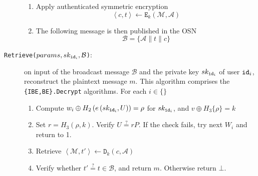\begin{algorithm}[H]
\begin{description}
\begin{enumerate}
        \item Apply authenticated symmetric encryption
        \begin{equation*}
            \left< c, t \right> \leftarrow \mathtt{E}_k(\mathcal{M},\mathcal{A})
        \end{equation*}
        \item The following message is then published in the OSN
        \begin{equation*}
            \mathcal{B} = \{ \mathcal{A} \parallel t \parallel c \}
        \end{equation*}
    \end{enumerate}
    \item[\texttt{Retrieve($params, sk_{\mathtt{id}_{i}}, \mathcal{B}$)}:] on input of the broadcast message $\mathcal{B}$ and the private key $sk_{\mathtt{id}_{i}}$ of user $\mathtt{id}_{i}$, reconstruct the plaintext message $m$. This algorithm comprises the \texttt{\{IBE,BE\}.Decrypt} algorithms. For each $i \in \{  \}$ \\

    \begin{enumerate}
        \item Compute $w_i \oplus H_2 \left( e \left( sk_{\mathtt{id}_{i}}, U \right) \right) = \rho$ for $sk_{\mathtt{id}_{i}}$, and $v \oplus H_3 \{ \rho \} = k$ 
        \item Set $r = H_3 \left( \rho, k \right)$. Verify $U \stackrel{?}{=} rP$. If the check fails, try next $W_i$ and return to 1.
        \item Retrieve $\left< \mathcal{M}, t' \right> \leftarrow \mathtt{D}_k(c, \mathcal{A})$
        \item Verify whether $t' \stackrel{?}{=} t \in \mathcal{B} $, and return $m$. Otherwise return $\bot$. 
    \end{enumerate}
\end{description}
\end{algorithm}
\newpage

\makeatletter
\setlength{\headsep}{19.8738pt}
\makeatother


